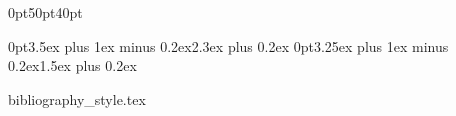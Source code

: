            {0pt}{50pt}{40pt}

\titlespacing*{\section}      {0pt}{3.5ex  plus 1ex minus 0.2ex}{2.3ex plus 0.2ex}
\titlespacing*{\subsection}   {0pt}{3.25ex plus 1ex minus 0.2ex}{1.5ex plus 0.2ex}

\newcommand*{\appxchaptosect}{\addtocontents{toc}{\let\protect\l@chapter\protect\l@section}}

\newcommand*{\chapterintrobox}[1]{%
\begin{tcolorbox}[colback=ThesisLghtGrey,colframe=ThesisLghtGrey,sharp corners]
  \textit{#1}
\end{tcolorbox}}

\renewcommand*{\mkbegdispquote}[2]{\openautoquote} %
\renewcommand*{\mkenddispquote}[2]{\closeautoquote#1#2}

{bibliography_style.tex}

\hypersetup{hidelinks}

\newcommand*{\frontchapter}[2]{%
\chapter*{#1}
\hypertarget{#2}{}
\bookmark[level=chapter,dest=#2]{#1}}

